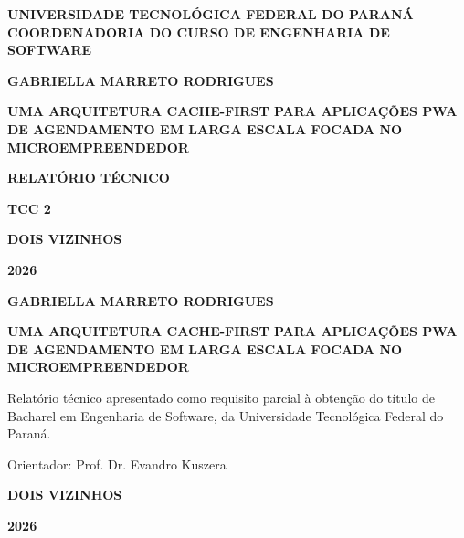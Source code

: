 \documentclass[12pt,a4paper]{article}
\title{\titulo}
\author{\autor}
\newcommand{\autor}{Gabriella Marreto Rodrigues}
\newcommand{\autorUppercase}{\MakeUppercase{\autor}}
\newcommand{\titulo}{Uma Arquitetura Cache-First para Aplicações PWA de Agendamento em Larga Escala Focada no Microempreendedor}
\newcommand{\tituloUppercase}{\MakeUppercase{\titulo}}
\newcommand{\orientador}{Prof. Dr. Evandro Kuszera}
\newcommand{\instituicao}{UNIVERSIDADE TECNOLÓGICA FEDERAL DO PARANÁ}
\newcommand{\coordenadoria}{COORDENADORIA DO CURSO DE ENGENHARIA DE SOFTWARE}
\newcommand{\ano}{2026}
\begin{document}
\begin{titlepage}
\centering
{\large \textbf{\instituicao}} \\[0.2cm]
{\large \textbf{\coordenadoria}} \\
\vspace*{3.0cm}
{\large \textbf{\autorUppercase} \par}
\vspace{3.5cm}
{\large \textbf{\tituloUppercase} \par}
\vspace{2.5cm}
{\large \textbf{RELATÓRIO TÉCNICO} \par}
\vspace{0.3cm}
{\large \textbf{TCC 2} \par}
\vspace*{\fill}
{\large \textbf{DOIS VIZINHOS} \par}
{\large \textbf{\ano} \par}
\end{titlepage}

\newpage
\pagestyle{empty}

\begin{titlepage}
\centering
{\large \textbf{\autorUppercase} \par}
\vspace{4.5cm}
{\large \textbf{\tituloUppercase} \par}
\vspace{3.5cm}

\hfill
\parbox[t]{8.5cm}{
\justifying
{Relatório técnico apresentado como requisito parcial à obtenção do título de Bacharel em Engenharia de Software, da Universidade Tecnológica Federal do Paraná. \par}
\vspace{0.6cm}
{Orientador: \orientador \par}
}

\vspace*{\fill}

{\large \textbf{DOIS VIZINHOS} \par}
{\large \textbf{\ano} \par} 
\end{titlepage}
\end{document}
